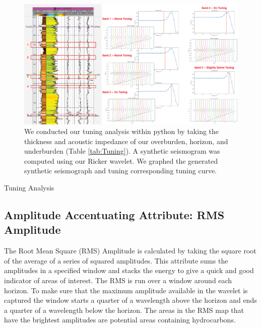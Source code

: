 \documentclass[fleqn]{article}
\begin{document}
\begin{figure}[H]
    \centering
    \includegraphics[width=\textwidth]{Images/Tuning.png}
    \caption{We conducted our tuning analysis within python by taking the thickness and acoustic impedance of our overburden, horizon, and underburden (Table \ref{tab:Tuning}). A synthetic seismogram was computed using our Ricker wavelet. We graphed the generated synthetic seismograph and tuning corresponding tuning curve.}
    \label{fig:Tuning}
\end{figure}

\begin{table}[H]
    \centering
    \caption{Tuning Analysis}
    \begin{adjustwidth}{-0.12\textwidth}{-0.12\textwidth}
        
        \label{tab:Tuning}
    \end{adjustwidth}
\end{table}

\subsection{Amplitude Accentuating Attribute: RMS Amplitude}

The Root Mean Square (RMS) Amplitude is calculated by taking the square root of the average of a series of squared amplitudes. This attribute sums the amplitudes in a specified window and stacks the energy to give a quick and good indicator of areas of interest. The RMS is run over a window around each horizon. To make sure that the maximum amplitude available in the wavelet is captured the window starts a quarter of a wavelength above the horizon and ends a quarter of a wavelength below the horizon. The areas in the RMS map that have the brightest amplitudes are potential areas containing hydrocarbons.
\end{document}
